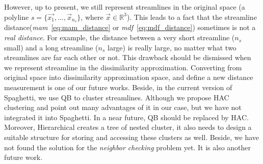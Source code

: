 However, up to present, we still represent streamlines in the original space (a polyline $s=\{\vec{x_1},\ldots,\vec{x}_{n_s}\}$, where $\vec{x} \in \mathbb{R}^3$).
This leads to a fact that the streamline distance(\textit{mam}~\ref{eq:mam_distance} or \textit{mdf}~\ref{eq:mdf_distance}) sometimes is not a \textit{real distance}. For example, the distance between a very short streamline ($n_s$ small) and a long streamline ($n_s$ large) is really large, no matter what two streamlines are far each other or not. This drawback should be dismissed when we represent streamline in the dissimilarity approximation. Converting from original space into dissimilarity approximation space, and define a new distance measurement is one of our future works. Beside, in the current version of Spaghetti, we use QB to cluster streamlines. Although we propose HAC clustering and point out many advantages of it in our case, but we have not integrated it into Spaghetti. In a near future, QB should be replaced by HAC. Moreover, Hierarchical creates a tree of nested cluster, it also needs to design a suitable structure for storing and accessing these clusters as well. Beside, we have not found the solution for the \emph{neighbor checking} problem yet. It is also another future work.
